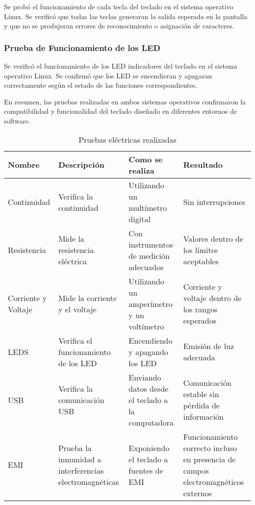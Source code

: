Se probó el funcionamiento de cada tecla del teclado en el sistema operativo \gls{Linux}. Se verificó que todas las teclas generaran la salida esperada en la pantalla y que no se produjeran errores de reconocimiento o asignación de caracteres.

\subsubsection{Prueba de Funcionamiento de los \gls{LED}}

Se verificó el funcionamiento de los \gls{LED} indicadores del teclado en el sistema operativo \gls{Linux}. Se confirmó que los \gls{LED} se encendieran y apagaran correctamente según el estado de las funciones correspondientes.

En resumen, las pruebas realizadas en ambos sistemas operativos confirmaron la compatibilidad y funcionalidad del teclado diseñado en diferentes entornos de software.

\begin{table}[h]
\small
\begin{tabular}{|l|p{2cm}|p{2.5cm}|p{3cm}|}
\hline
Nombre & Descripción & Como se realiza & Resultado \\
\hline
Continuidad & Verifica la continuidad & Utilizando un multímetro digital & Sin interrupciones \\
\hline
Resistencia & Mide la resistencia eléctrica & Con instrumentos de medición adecuados & Valores dentro de los límites aceptables \\
\hline
Corriente y Voltaje & Mide la corriente y el voltaje & Utilizando un amperímetro y un voltímetro & Corriente y voltaje dentro de los rangos esperados \\
\hline
\gls{LED}S & Verifica el funcionamiento de los \gls{LED} & Encendiendo y apagando los \gls{LED} & Emisión de luz adecuada \\
\hline
\gls{USB} & Verifica la comunicación \gls{USB} & Enviando datos desde el teclado a la computadora & Comunicación estable sin pérdida de información \\
\hline
\gls{EMI} & Prueba la inmunidad a interferencias electromagnéticas & Exponiendo el teclado a fuentes de \gls{EMI} & Funcionamiento correcto incluso en presencia de campos electromagnéticos externos \\
\hline
\end{tabular}
\caption{Pruebas eléctricas realizadas}
\label{Table:PruebasElectricas}
\end{table}

